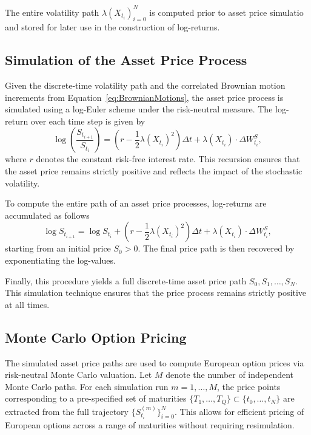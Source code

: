 The entire volatility path ${\lambda(X_{t_i})}_{i=0}^N$ is computed prior to asset price simulatio and stored for later use in the construction of log-returns.


\subsection{Simulation of the Asset Price Process} \label{subsec: Simulation of the Asset Price Process}

Given the discrete-time volatility path and the correlated Brownian motion increments from Equation~\eqref{eq:BrownianMotions}, the asset price process is simulated using a log-Euler scheme under the risk-neutral measure. The log-return over each time step is given by
\begin{equation} \label{eq:TimeDiscrLogReturn}
    \log\left( \frac{S_{t_{i+1}}}{S_{t_i}} \right) = \left( r - \frac{1}{2} \lambda(X_{t_i})^2 \right) \Delta t + \lambda(X_{t_i}) \cdot \Delta W_{t_i}^S,
\end{equation}
where $r$ denotes the constant risk-free interest rate. This recursion ensures that the asset price remains strictly positive and reflects the impact of the stochastic volatility.

To compute the entire path of an asset price processes, log-returns are accumulated as follows
\begin{equation} \label{eq:TimeDiscrLogPrice}
    \log S_{t_{i+1}} = \log S_{t_i} + \left( r - \frac{1}{2} \lambda(X_{t_i})^2 \right) \Delta t + \lambda(X_{t_i}) \cdot \Delta W_{t_i}^S,
\end{equation}
starting from an initial price $S_0 > 0$. The final price path is then recovered by exponentiating the log-values.

Finally, this procedure yields a full discrete-time asset price path $S_0, S_1, \ldots, S_N$. This simulation technique ensures that the price process remains strictly positive at all times.


\subsection{Monte Carlo Option Pricing} \label{subsec: Monte Carlo Option Pricing}

The simulated asset price paths are used to compute European option prices via risk-neutral Monte Carlo valuation. Let $M$ denote the number of independent Monte Carlo paths. For each simulation run $m = 1, \ldots, M$, the price points corresponding to a pre-specified set of maturities $\{T_1,\ldots,T_Q\} \subset \{t_0,\ldots,t_N\}$ are extracted from the full trajectory $\{S_{t_i}^{(m)}\}_{i=0}^N$. This allows for efficient pricing of European options across a range of maturities without requiring resimulation.


